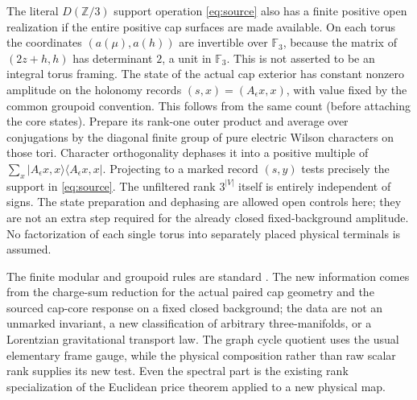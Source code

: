 \documentclass[11pt]{article}
\newcommand{\F}{\mathbb F_3}
\newcommand{\Z}{\mathbb Z}
\begin{document}
The literal \(D(\Z/3)\) support operation \eqref{eq:source} also has a finite positive open realization if the entire positive cap surfaces are made available. On each torus the coordinates \((a(\mu),a(h))\) are invertible over \(\F\), because the matrix of \((2z+h,h)\) has determinant \(2\), a unit in \(\F\). This is not asserted to be an integral torus framing. The state of the actual cap exterior has constant nonzero amplitude on the holonomy records \((s,x)=(A_\epsilon x,x)\), with value fixed by the common groupoid convention. This follows from the same count (before attaching the core states). Prepare its rank-one outer product and average over conjugations by the diagonal finite group of pure electric Wilson characters on those tori. Character orthogonality dephases it into a positive multiple of
\(\sum_x|A_\epsilon x,x\rangle\langle A_\epsilon x,x|\). Projecting to a marked record \((s,y)\) tests precisely the support in \eqref{eq:source}. The unfiltered rank \(3^{|V|}\) itself is entirely independent of signs. The state preparation and dephasing are allowed open controls here; they are not an extra step required for the already closed fixed-background amplitude. No factorization of each single torus into separately placed physical terminals is assumed.

The finite modular and groupoid rules are standard \cite{rt,dgno,fq,dw,balsam}. The new information comes from the charge-sum reduction for the actual paired cap geometry and the sourced cap-core response on a fixed closed background; the data are not an unmarked invariant, a new classification of arbitrary three-manifolds, or a Lorentzian gravitational transport law. The graph cycle quotient uses the usual elementary frame gauge, while the physical composition rather than raw scalar rank supplies its new test. Even the spectral part is the existing rank specialization of the Euclidean price theorem applied to a new physical map.
\end{document}

